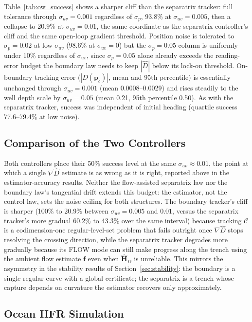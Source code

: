 \documentclass[lettersize,journal]{IEEEtran}
\begin{document}
Table~\ref{tab:ow_success} shows a sharper cliff than the separatrix
tracker: full tolerance through $\sigma_{uv} = 0.001$ regardless of
$\sigma_p$, 93.8\% at $\sigma_{uv} = 0.005$, then a collapse to 20.9\%
at $\sigma_{uv} = 0.01$, the same coordinate as the separatrix
controller's cliff and the same open-loop gradient threshold. Position
noise is tolerated to $\sigma_p = 0.02$ at low $\sigma_{uv}$ (98.6\% at
$\sigma_{uv} = 0$) but the $\sigma_p = 0.05$ column is uniformly under
10\% regardless of $\sigma_{uv}$, since $\sigma_p = 0.05$ alone already
exceeds the reading-error budget the boundary law needs to keep
$|\hat{D}|$ below its lock-on threshold. On-boundary tracking error
($|D(\mathbf{p}_c)|$, mean and 95th percentile) is essentially unchanged
through $\sigma_{uv} = 0.001$ (mean 0.0008--0.0029) and rises steadily
to the well depth scale by $\sigma_{uv} = 0.05$ (mean 0.21, 95th
percentile 0.50). As with the separatrix tracker, success was
independent of initial heading (quartile success 77.6--79.4\% at low
noise).

\subsection{Comparison of the Two Controllers}

Both controllers place their 50\% success level at the same
$\sigma_{uv} \approx 0.01$, the point at which a single
$\nabla\hat{D}$ estimate is as wrong as it is right, reported above in
the estimator-accuracy results. Neither the flow-assisted
separatrix law nor the boundary law's tangential drift extends this
budget: the estimator, not the control law, sets the noise ceiling for
both structures. The boundary tracker's cliff is sharper (100\% to
20.9\% between $\sigma_{uv} = 0.005$ and $0.01$, versus the separatrix
tracker's more gradual 60.2\% to 43.3\% over the same interval) because
tracking $\mathcal{C}$ is a codimension-one regular-level-set problem
that fails outright once $\nabla\hat{D}$ stops resolving the crossing
direction, while the separatrix tracker degrades more gradually because
its FLOW mode can still make progress along the trench using the
ambient flow estimate $\mathbf{f}$ even when $\hat{\mathbf{H}}_D$ is
unreliable. This mirrors the asymmetry in the stability results of
Section~\ref{sec:stability}: the boundary is a single regular curve with
a global certificate; the separatrix is a trench whose capture depends
on curvature the estimator recovers only approximately.

\subsection{Ocean HFR Simulation}
\label{sec:results_ocean}
\end{document}
